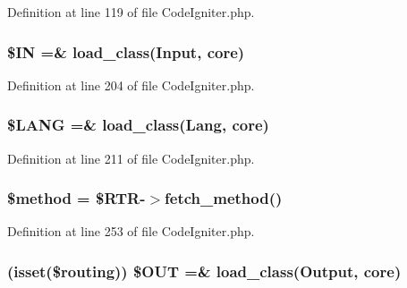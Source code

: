 Definition at line 119 of file Code\+Igniter.\+php.

\subsubsection[{\texorpdfstring{\$\+IN}{$IN}}]{\setlength{\rightskip}{0pt plus 5cm}\$IN =\& load\+\_\+class(\textquotesingle{}Input\textquotesingle{}, \textquotesingle{}core\textquotesingle{})}\hypertarget{_code_igniter_8php_a66d076d48aff75a01bb726f5bdd94d46}{}\label{_code_igniter_8php_a66d076d48aff75a01bb726f5bdd94d46}


Definition at line 204 of file Code\+Igniter.\+php.

\subsubsection[{\texorpdfstring{\$\+L\+A\+NG}{$LANG}}]{\setlength{\rightskip}{0pt plus 5cm}\$L\+A\+NG =\& load\+\_\+class(\textquotesingle{}Lang\textquotesingle{}, \textquotesingle{}core\textquotesingle{})}\hypertarget{_code_igniter_8php_afab4eb732acc05cebf41e0afce18681c}{}\label{_code_igniter_8php_afab4eb732acc05cebf41e0afce18681c}


Definition at line 211 of file Code\+Igniter.\+php.

\subsubsection[{\texorpdfstring{\$method}{$method}}]{\setlength{\rightskip}{0pt plus 5cm}\$method = \$R\+TR-\/$>$fetch\+\_\+method()}\hypertarget{_code_igniter_8php_a12661b2fc0f57f97e30a1620889ce9c6}{}\label{_code_igniter_8php_a12661b2fc0f57f97e30a1620889ce9c6}


Definition at line 253 of file Code\+Igniter.\+php.

\subsubsection[{\texorpdfstring{\$\+O\+UT}{$OUT}}]{ (isset(\$routing)) \$O\+UT =\& load\+\_\+class(\textquotesingle{}Output\textquotesingle{}, \textquotesingle{}core\textquotesingle{})}\hypertarget{_code_igniter_8php_a3f9ee241bf32c302b003449e028c859b}{}\label{_code_igniter_8php_a3f9ee241bf32c302b003449e028c859b}


